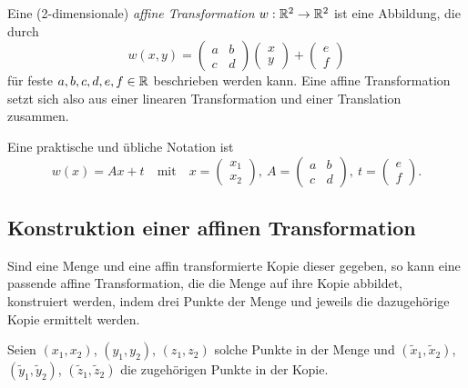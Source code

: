 \documentclass[afourpaper]{latex-classes/handout}
\begin{document}
Eine (2-dimensionale) \emph{affine Transformation} \( w : \mathbb{R}^2 \to \mathbb{R}^2 \) ist eine Abbildung, die durch
\begin{equation*}
  w(x,y) = \begin{pmatrix}
    a & b \\ c & d
  \end{pmatrix} \begin{pmatrix}
    x \\ y
  \end{pmatrix} + \begin{pmatrix}
    e \\ f
  \end{pmatrix}
\end{equation*}
für feste \( a,b,c,d,e,f \in \mathbb{R} \) beschrieben werden kann. Eine affine Transformation setzt sich also aus einer linearen Transformation und einer Translation zusammen.

Eine praktische und übliche Notation ist
\begin{equation*}
  w(x) = Ax + t \quad \text{mit} \quad x = \begin{pmatrix}
    x_1 \\ x_2
  \end{pmatrix},\ A = \begin{pmatrix}
    a & b \\ c & d
  \end{pmatrix},\ t = \begin{pmatrix}
    e \\ f
  \end{pmatrix}\text{.}
\end{equation*}

\subsection{Konstruktion einer affinen Transformation}

Sind eine Menge und eine affin transformierte Kopie dieser gegeben, so kann eine passende affine Transformation, die die Menge auf ihre Kopie abbildet, konstruiert werden, indem drei Punkte der Menge und jeweils die dazugehörige Kopie ermittelt werden.

Seien \( (x_1, x_2) \), \( (y_1, y_2) \), \( (z_1, z_2) \) solche Punkte in der Menge und \( (\widetilde{x}_1, \widetilde{x}_2) \), \( (\widetilde{y}_1, \widetilde{y}_2) \), \( (\widetilde{z}_1, \widetilde{z}_2) \) die zugehörigen Punkte in der Kopie.
\end{document}
